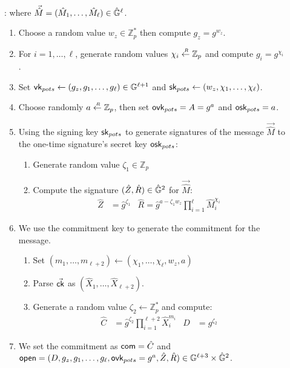 \begin{description}
\item[]: where $\vec{\hat{M}} = (\hat{M}_1, \dots, \hat{M}_\ell) \in \hat{\mathbb{G}}^\ell$.
  \begin{enumerate}
  \item Choose a random value $w_z \in \mathbb{Z}_p^*$ then compute $g_z = g^{w_z}$.
  \item For $i = 1, \dots, \ell$, generate random values $\chi_i \stackrel{{\scriptscriptstyle \mkern4mu R}}{\gets} \mathbb{Z}_p$ and compute $g_i = g^{\chi_i}$.
  \item Set $\mathsf{vk}_{pots} \gets (g_z, g_1, \dots, g_\ell) \in \mathbb{G}^{\ell+1}$ and $\mathsf{sk}_{pots} \gets (w_z,\chi_1, \dots, \chi_\ell)$.
  \item Choose randomly $a \stackrel{{\scriptscriptstyle \mkern4mu R}}{\gets} \mathbb{Z}_p$, then set $\mathsf{ovk}_{pots} =A = g^{a}$ and $\mathsf{osk}_{pots} = a$.
  \item Using the signing key $\mathsf{sk}_{pots}$ to generate signatures of the message $\vec{\hat{M}}$ \wrt to the one-time signature's secret key $\mathsf{osk}_{pots}$:
    \begin{enumerate}
    \item Generate random value $\zeta_1 \in \mathbb{Z}_p$
    \item Compute the signature $(\hat{Z}, \hat{R}) \in \hat{\mathbb{G}}^2$ for $\vec{\hat{M}}$:
      \begin{align*}
	\hat{Z} &= \hat{g}^{\zeta_1} & \hat{R} = \hat{g}^{a-\zeta_1 w_z}\prod_{i=1}^{\ell} \hat{M}_i^{\chi_i} 
      \end{align*}
    \end{enumerate}
  \item We use the commitment key to generate the commitment for the message.
    \begin{enumerate}
    \item Set $(m_1, \dots, m_{\ell+2}) \gets (\chi_1, \dots, \chi_\ell, w_z, a)$ 
    \item Parse $\vec{\mathsf{ck}}$ as $(\hat{X}_1, \dots, \hat{X}_{\ell+2})$.
    \item Generate a random value $\zeta_2 \gets \mathbb{Z}_p^*$ and compute:
      \begin{align*}
	\hat{C} &= \hat{g}^{\zeta_2}\prod_{i = 1}^{\ell+2}\hat{X}_i^{m_i} & D &= g^{\zeta_2}
      \end{align*}
    \end{enumerate}
  \item We set the commitment as $\mathsf{com}  = \hat{C}$ and $\mathsf{open} = (D, g_z, g_1, \dots, g_\ell, \mathsf{ovk}_{pots} = g^a, \hat{Z}, \hat{R}) \in \mathbb{G}^{\ell+3} \times \hat{\mathbb{G}}^{2}$.
  \end{enumerate}
  

\end{description}
